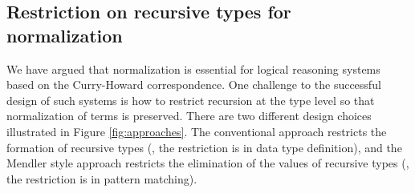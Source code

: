 \subsection{Restriction on recursive types for normalization}
\label{sec:relwork:other}
We have argued that normalization is essential for logical reasoning systems
based on the Curry-Howard correspondence. One challenge to the successful
design of such systems is how to restrict recursion at the type level
so that normalization of terms is preserved. 
There are two different
design choices illustrated in Figure \ref{fig:approaches}. 
The conventional approach restricts the formation
of recursive types (\ie, the restriction is in data type definition), and
the Mendler style approach restricts the elimination
of the values of recursive types (\ie, the restriction is in pattern matching).

